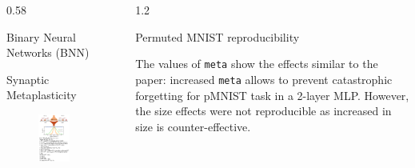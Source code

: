 \documentclass[aspectratio=32, final]{beamer}
\newlength{\sepwidth}
\newlength{\colwidth}
\newcommand{\separatorcolumn}{\begin{column}{\sepwidth}\end{column}}
\begin{document}
\begin{frame}[t]
\begin{columns}[t]
\begin{column}{0.58\colwidth}
\begin{alertblock}{Binary Neural Networks (BNN)}
  \end{alertblock}
  
  \begin{block}{Synaptic Metaplasticity \cite{Laborieux2021-pv} }
 

 \begin{figure}
     \includegraphics[width=0.42\colwidth]{figures/metaplasticity.pdf}
 \end{figure}
 
\end{block}

\end{column}

\separatorcolumn

\begin{column}{1.2\colwidth}
    
  \begin{block}{Permuted MNIST reproducibility}
    
    The values of \texttt{meta} show the effects similar to the paper: increased \texttt{meta} allows to prevent catastrophic forgetting for pMNIST task in a 2-layer MLP. However, the size effects were not reproducible as increased in size is counter-effective. 
    

\end{block}
\end{column}
\end{columns}
\end{frame}
\end{document}
